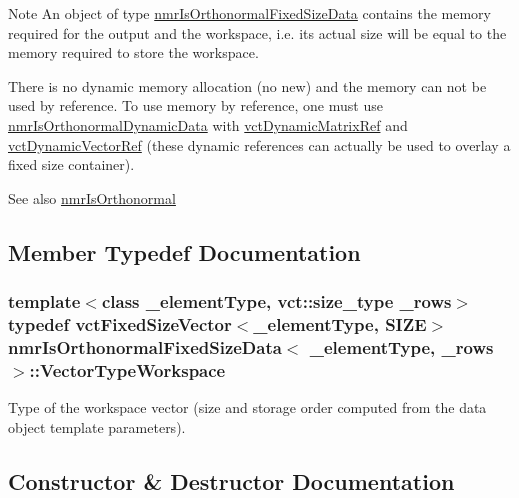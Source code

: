 \begin{DoxyNote}{Note}
An object of type \hyperlink{classnmr_is_orthonormal_fixed_size_data}{nmr\+Is\+Orthonormal\+Fixed\+Size\+Data} contains the memory required for the output and the workspace, i.\+e. its actual size will be equal to the memory required to store the workspace.

There is no dynamic memory allocation (no {\ttfamily new}) and the memory can not be used by reference. To use memory by reference, one must use \hyperlink{classnmr_is_orthonormal_dynamic_data}{nmr\+Is\+Orthonormal\+Dynamic\+Data} with \hyperlink{classvct_dynamic_matrix_ref}{vct\+Dynamic\+Matrix\+Ref} and \hyperlink{classvct_dynamic_vector_ref}{vct\+Dynamic\+Vector\+Ref} (these dynamic references can actually be used to overlay a fixed size container).
\end{DoxyNote}
\begin{DoxySeeAlso}{See also}
\hyperlink{nmr_is_orthonormal_8h_acf0ff1e2dbe0c988db04d9db1e2e7697}{nmr\+Is\+Orthonormal} 
\end{DoxySeeAlso}


\subsection{Member Typedef Documentation}
\hypertarget{classnmr_is_orthonormal_fixed_size_data_a9c2423d8da4e6400b83e1425454bbbe3}{}
\subsubsection[{Vector\+Type\+Workspace}]{\setlength{\rightskip}{0pt plus 5cm}template$<$class \+\_\+element\+Type, vct\+::size\+\_\+type \+\_\+rows$>$ typedef {\bf vct\+Fixed\+Size\+Vector}$<$\+\_\+element\+Type, {\bf S\+I\+Z\+E}$>$ {\bf nmr\+Is\+Orthonormal\+Fixed\+Size\+Data}$<$ \+\_\+element\+Type, \+\_\+rows $>$\+::{\bf Vector\+Type\+Workspace}}\label{classnmr_is_orthonormal_fixed_size_data_a9c2423d8da4e6400b83e1425454bbbe3}
Type of the workspace vector (size and storage order computed from the data object template parameters). 

\subsection{Constructor \& Destructor Documentation}
\hypertarget{classnmr_is_orthonormal_fixed_size_data_aa9468e75b1a0437d067e1bafd9cbee0e}{}
